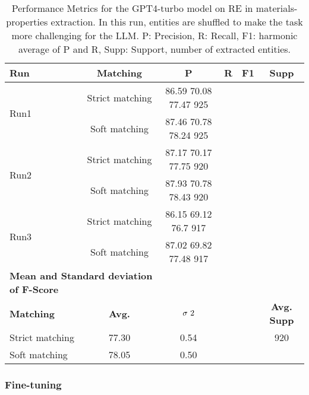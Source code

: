 \begin{table}[htbp]
    \small
    \centering
    \caption{Performance Metrics for the GPT4-turbo model on RE in materials-properties extraction. In this run, entities are shuffled to make the task more challenging for the LLM. P: Precision, R: Recall, F1: harmonic average of P and R, Supp: Support, number of extracted entities.}
    \begin{tabular}{lccccc}
        \toprule
        \textbf{Run} & \textbf{Matching} & \textbf{P} & \textbf{R} & \textbf{F1} & \textbf{Supp} \\
        \midrule
        \multirow{2}{*}{Run1} & Strict matching & 86.59	70.08	77.47	925 \\
        & Soft matching & 87.46	70.78	78.24	925 \\
        \midrule
        \multirow{2}{*}{Run2} & Strict matching & 87.17	70.17	77.75	920\\
        & Soft matching & 87.93	70.78	78.43	920 \\
        \midrule
        \multirow{2}{*}{Run3} & Strict matching & 86.15	69.12	76.7	917\\
        & Soft matching & 87.02	69.82	77.48	917 \\
        \midrule
        \multicolumn{2}{l}{\textbf{Mean and Standard deviation of F-Score}} & & & & \\
        \midrule
        \textbf{Matching} & \textbf{Avg.} & $\sigma\textsuperscript{2}$ & & & \textbf{Avg. Supp}\\
        Strict matching & 77.30 & 0.54 & & & 920 \\
        Soft matching & 78.05 & 0.50 & & \\
        \bottomrule
    \end{tabular}
\end{table}

\clearpage
\subsubsection{Fine-tuning}

